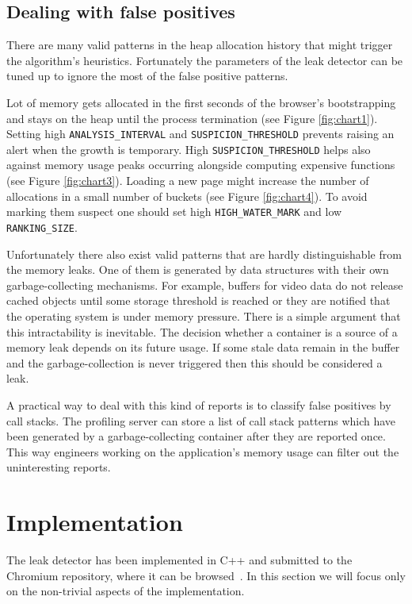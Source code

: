 \documentclass[preprint, numbers]{sigplanconf}
\begin{document}
\subsection{Dealing with false positives}
\label{sec:false}

There are many valid patterns in the heap allocation history that might trigger the algorithm's
heuristics.
Fortunately the parameters of the leak detector can be tuned up to ignore the most of
the false positive patterns.

Lot of memory gets allocated in the first seconds of the browser's bootstrapping
and stays on the heap until the process termination (see Figure \ref{fig:chart1}).
Setting high \texttt{ANALYSIS\_INTERVAL} and \texttt{SUSPICION\_THRESHOLD}
prevents raising an alert when the growth is temporary.
High \texttt{SUSPICION\_THRESHOLD} helps also against memory usage peaks
occurring alongside computing expensive functions (see Figure \ref{fig:chart3}).
Loading a new page might increase the number of allocations in a small
number of buckets (see Figure \ref{fig:chart4}).
To avoid marking them suspect one should set high \texttt{HIGH\_WATER\_MARK}
and low \texttt{RANKING\_SIZE}.

Unfortunately there also exist valid patterns that are hardly distinguishable from
the memory leaks.
One of them is generated by data structures with their own garbage-collecting mechanisms.
For example, buffers for video data do not release cached objects until some storage threshold
is reached or they are notified that the operating system is under memory pressure.
There is a simple argument that this intractability is inevitable.
The decision whether a container is a source of a memory leak
depends on its future usage.
If some stale data remain in the buffer and the garbage-collection is never triggered
then this should be considered a leak.

A practical way to deal with this kind of reports is to
classify false positives by call stacks.
The profiling server can store a list of call stack patterns
which have been generated by a garbage-collecting container
after they are reported once.
This way engineers working on the application's memory usage
can filter out the uninteresting reports.

\section{Implementation}
The leak detector has been implemented in C++ and submitted to the Chromium repository, where
it can be browsed~\cite{chromium-leak}.
In this section we will focus only on the non-trivial aspects of the implementation.
\end{document}
